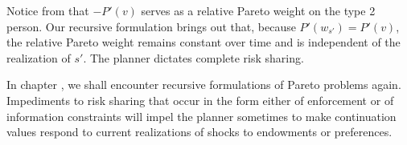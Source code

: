  Notice from
 that $-P'(v)$ serves as a   relative Pareto weight on
the type 2 person. Our recursive formulation brings out that,
because $P'(w_{s'}) = P'(v)$,
 the relative  Pareto weight remains constant over time and is independent
of the  realization of $s'$.    The planner dictates
complete risk sharing.


In chapter , we shall encounter recursive formulations
of Pareto problems
again. Impediments to risk sharing that occur in the form
either of enforcement or of information constraints will
impel the planner sometimes to make continuation values respond
to current realizations of shocks to endowments or preferences.



